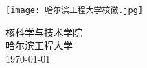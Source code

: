 \begin{titlepage}
    \begin{center}
        \vspace*{4cm}


        \vspace{1.5cm}


        \vfill

        \scalebox{1.2}{
            用于解决DETRIA程序分布式计算
        }

        \vspace{2.8cm}

        \texttt{[image: 哈尔滨工程大学校徽.jpg]}

        \vspace{1.8cm}


        \LARGE 核科学与技术学院\\
        \Large 哈尔滨工程大学\\
        \vspace{0.5cm}
        \today

    \end{center}
\end{titlepage}